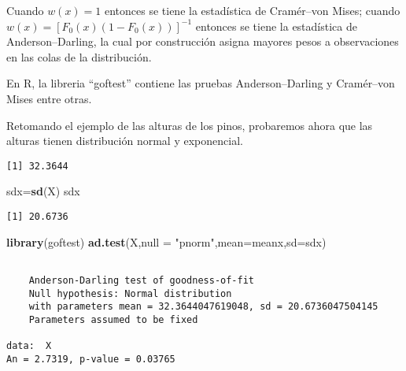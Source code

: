 \documentclass[
  a4paper,
  oneside,
  openany]{book}
\newenvironment{Shaded}{\begin{snugshade}}{\end{snugshade}}
\newcommand{\AttributeTok}[1]{\textcolor[rgb]{0.13,0.29,0.53}{#1}}
\newcommand{\FunctionTok}[1]{\textcolor[rgb]{0.13,0.29,0.53}{\textbf{#1}}}
\newcommand{\NormalTok}[1]{#1}
\newcommand{\OtherTok}[1]{\textcolor[rgb]{0.56,0.35,0.01}{#1}}
\newcommand{\SpecialCharTok}[1]{\textcolor[rgb]{0.81,0.36,0.00}{\textbf{#1}}}
\newcommand{\StringTok}[1]{\textcolor[rgb]{0.31,0.60,0.02}{#1}}
\begin{document}
Cuando \(w(x)=1\) entonces se tiene la estadística de Cramér--von Mises; cuando \(w(x)=[F_0(x)(1-F_0(x))]^{-1}\) entonces se tiene la estadística de Anderson--Darling, la cual por construcción asigna mayores pesos a observaciones en las colas de la distribución.

En R, la libreria ``goftest'' contiene las pruebas Anderson--Darling y Cramér--von Mises entre otras.

Retomando el ejemplo de las alturas de los pinos, probaremos ahora que las alturas tienen distribución normal y exponencial.

\begin{Shaded}
\end{Shaded}

\begin{verbatim}
[1] 32.3644
\end{verbatim}

\begin{Shaded}
\begin{Highlighting}[]
\NormalTok{sdx}\OtherTok{=}\FunctionTok{sd}\NormalTok{(X)}
\NormalTok{sdx}
\end{Highlighting}
\end{Shaded}

\begin{verbatim}
[1] 20.6736
\end{verbatim}

\begin{Shaded}
\begin{Highlighting}[]
\FunctionTok{library}\NormalTok{(goftest)}
\FunctionTok{ad.test}\NormalTok{(X,}\AttributeTok{null =} \StringTok{"pnorm"}\NormalTok{,}\AttributeTok{mean=}\NormalTok{meanx,}\AttributeTok{sd=}\NormalTok{sdx)}
\end{Highlighting}
\end{Shaded}

\begin{verbatim}

    Anderson-Darling test of goodness-of-fit
    Null hypothesis: Normal distribution
    with parameters mean = 32.3644047619048, sd = 20.6736047504145
    Parameters assumed to be fixed

data:  X
An = 2.7319, p-value = 0.03765
\end{verbatim}
\end{document}

